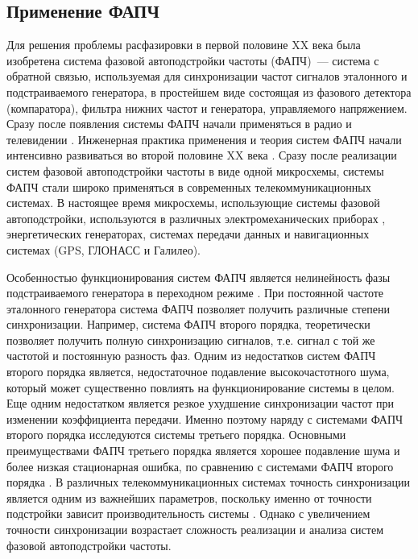 \documentclass[a4paper,article,14pt]{extarticle}
\begin{document}
 \subsection{Применение ФАПЧ}

Для решения проблемы расфазировки в первой половине XX века была изобретена система фазовой автоподстройки частоты \cite{appleton} (ФАПЧ)~--- система с обратной связью, используемая для синхронизации частот сигналов эталонного и подстраиваемого генератора, в простейшем виде состоящая из фазового детектора (компаратора), фильтра нижних частот и генератора, управляемого напряжением. Сразу после появления системы ФАПЧ начали применяться в радио и телевидении \cite{blagov}. Инженерная практика применения и теория систем ФАПЧ начали интенсивно развиваться во второй половине XX века \cite{seledji}. Сразу после реализации систем фазовой автоподстройки частоты в виде одной микросхемы, системы ФАПЧ стали широко применяться в современных телекоммуникационных системах. В настоящее время микросхемы, использующие системы фазовой автоподстройки, используются в различных электромеханических приборах \cite{best}, энергетических генераторах, системах передачи данных \cite{ashari} и навигационных системах \cite{rao} (GPS, ГЛОНАСС и Галилео).

Особенностью функционирования систем ФАПЧ является нелинейность фазы подстраиваемого генератора в переходном режиме \cite{kuznetsov_nonlinear}. При постоянной частоте эталонного генератора система ФАПЧ позволяет получить различные степени синхронизации. Например, система ФАПЧ второго порядка, теоретически позволяет получить полную синхронизацию сигналов, т.е. сигнал с той же частотой и постоянную разность фаз. Одним из недостатков систем ФАПЧ второго порядка является, недостаточное подавление высокочастотного шума, который может существенно повлиять на функционирование системы в целом. Еще одним недостатком является резкое ухудшение синхронизации частот при изменении коэффициента передачи. Именно поэтому наряду с системами ФАПЧ второго порядка исследуются системы третьего порядка. Основными преимуществами ФАПЧ третьего порядка является хорошее подавление шума и более низкая стационарная ошибка, по сравнению с системами ФАПЧ второго порядка \cite{thirdOrderPLL}. В различных телекоммуникационных системах точность синхронизации является одним из важнейших параметров, поскольку именно от точности подстройки зависит производительность системы \cite{UsageOfThirdOrder1}. Однако с увеличением точности синхронизации возрастает сложность реализации и анализа систем фазовой автоподстройки частоты. 
\end{document}
